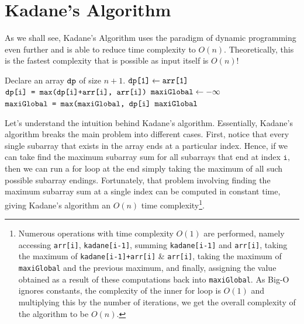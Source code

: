
\section{Kadane's Algorithm}

As we shall see, Kadane's Algorithm uses the paradigm of dynamic programming even further and is able to reduce time complexity to $O(n).$ Theoretically, this is the fastest complexity that is possible as input itself is $O(n)$! 

\begin{algorithm}
\caption{}\label{Kadane}
\begin{algorithmic}[1]
\State Declare an array $\texttt{dp}$ of size $n+1$.
\State $\texttt{dp[1]} \gets \texttt{arr[1]}$
    \State $\texttt{dp[i] = max(dp[i]+arr[i], arr[i])}$
\EndFor
\State $\texttt{maxiGlobal} \gets -\infty$ 
    \State $\texttt{maxiGlobal = max(maxiGlobal, dp[i]}$
\EndFor 
\State \Return $\texttt{maxiGlobal}$
\end{algorithmic}
\end{algorithm}

\noindent \newline Let's understand the intuition behind Kadane's algorithm. Essentially, Kadane's algorithm breaks the main problem into different cases. First, notice that every single subarray that exists in the array ends at a particular index. Hence, if we can take find the maximum subarray sum for all subarrays that end at index $\texttt{i},$ then we can run a for loop at the end simply taking the maximum of all such possible subarray endings. Fortunately, that problem involving finding the maximum subarray sum at a single index can be computed in constant time, giving Kadane's algorithm an $O(n)$ time complexity\footnote{Numerous operations with time complexity $O(1)$ are performed, namely accessing \texttt{arr[i]}, \texttt{kadane[i-1]}, summing \texttt{kadane[i-1]} and \texttt{arr[i]}, taking the maximum of \texttt{kadane[i-1]+arr[i]} & \texttt{arr[i]}, taking the maximum of \texttt{maxiGlobal} and the previous maximum, and finally, assigning the value obtained as a result of these computations back into \texttt{maxiGlobal}. As Big-O ignores constants, the complexity of the inner for loop is $O(1)$ and multiplying this by the number of iterations, we get the overall complexity of the algorithm to be $O(n)$.}.
